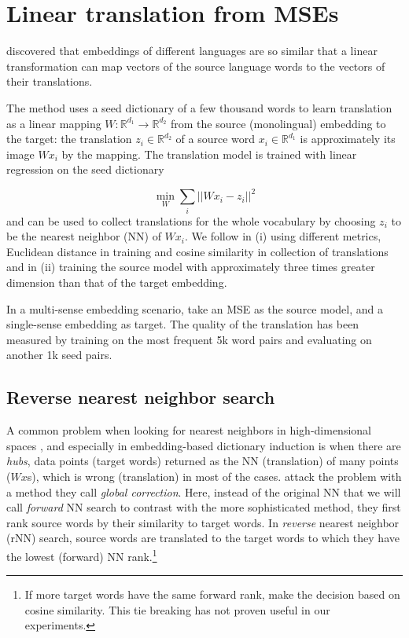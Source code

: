 \documentclass[11pt]{article}
\newcommand{\Ro}{\mathbb{R}^{d_1}}
\newcommand{\Rt}{\mathbb{R}^{d_2}}
\begin{document}
\section{Linear translation from MSEs}
\label{sec:linTrans}

\cite{Mikolov:2013x} discovered that embeddings of different languages are so
similar that a linear transformation can map vectors of the source language
words to the vectors of their translations.

The method uses a seed dictionary of a few thousand words to learn translation
as a linear mapping $W: \mathbb{R}^{d_1}\rightarrow \mathbb{R}^{d_2}$ from the
source (monolingual) embedding to the target: the translation $z_i \in \Rt$ of
a source word $x_i \in \Ro$ is approximately its image $Wx_i$ by the mapping.
The translation model is trained with linear regression on the seed dictionary

\[\min_W \sum_i || Wx_i - z_i ||^2 \]
and can be used to collect translations for the whole vocabulary by choosing
$z_i$ to be the nearest neighbor (NN) of $Wx_i$.  We follow
\cite{Mikolov:2013x} in (i) using different metrics, Euclidean distance in training
and cosine similarity in collection of translations and in (ii) training the
source model with approximately three times greater dimension than that of the
target embedding.

In a multi-sense embedding scenario, \cite{Borbely:2016} take an MSE as the
source model, and a single-sense embedding as target.  The quality of the
translation has been measured by training on the most frequent 5k word pairs
and evaluating on another 1k seed pairs.

\subsection{Reverse nearest neighbor search}


A common problem when looking for nearest neighbors in high-dimensional spaces
\citep{Radovanovic:2010,Suzuki:2013,Tomasev:2013}, and especially in
embedding-based dictionary induction \citep{Dinu:2015,Lazaridou:2015} is when
there are \emph{hubs}, data points (target words) returned as the NN
(translation) of many points ($Wx$s), which is wrong (translation) in most of
the cases.  \cite{Dinu:2015} attack the problem with a method they call
\emph{global correction}.  Here, instead of the original NN that we will call
\emph{forward} NN search to contrast with the more sophisticated method, they
first rank source words by their similarity to target words. In \emph{reverse}
nearest neighbor (rNN) search, source words are translated to the target words
to which they have the lowest (forward) NN rank.\footnote{If more target words
have the same forward rank, \cite{Dinu:2015} make the decision based on cosine
similarity. This tie breaking has not proven useful in our experiments.}
\end{document}
